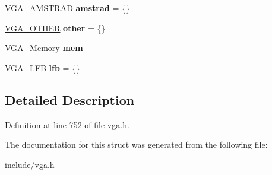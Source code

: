 \begin{DoxyCompactItemize}
\item 
\hypertarget{structVGA__Type__t_a1b79f91b152434901b200ad60e08ab25}{\hyperlink{structVGA__AMSTRAD}{V\-G\-A\-\_\-\-A\-M\-S\-T\-R\-A\-D} {\bfseries amstrad} = \{\}}\label{structVGA__Type__t_a1b79f91b152434901b200ad60e08ab25}

\item 
\hypertarget{structVGA__Type__t_a21eebf3cb6a28be44b5669666c58ad87}{\hyperlink{structVGA__OTHER}{V\-G\-A\-\_\-\-O\-T\-H\-E\-R} {\bfseries other} = \{\}}\label{structVGA__Type__t_a21eebf3cb6a28be44b5669666c58ad87}

\item 
\hypertarget{structVGA__Type__t_a040dc88066ed5fb83e04c6fdf8abc643}{\hyperlink{structVGA__Memory__t}{V\-G\-A\-\_\-\-Memory} {\bfseries mem}}\label{structVGA__Type__t_a040dc88066ed5fb83e04c6fdf8abc643}

\item 
\hypertarget{structVGA__Type__t_a62c5cc41fbe2d60b81bfe525323a1ca4}{\hyperlink{structVGA__LFB}{V\-G\-A\-\_\-\-L\-F\-B} {\bfseries lfb} = \{\}}\label{structVGA__Type__t_a62c5cc41fbe2d60b81bfe525323a1ca4}

\end{DoxyCompactItemize}


\subsection{Detailed Description}


Definition at line 752 of file vga.\-h.



The documentation for this struct was generated from the following file\-:\begin{DoxyCompactItemize}
\item 
include/vga.\-h\end{DoxyCompactItemize}
